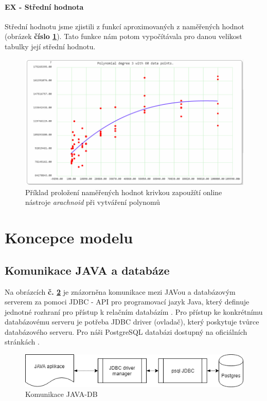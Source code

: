 \documentclass[a4paper, 11pt]{article}
\begin{document}
\paragraph{EX - Střední hodnota} Střední hodnotu jsme zjistili z funkcí  aproximovaných z naměřených hodnot (obrázek \textbf{číslo \ref{sec:obr9}}). Tato funkce nám potom vypočítávala pro danou velikost tabulky její střední hodnotu.

\begin{figure}[H]
\centering
\includegraphics[width=150mm, frame]{images/VYPOCET-KRIVEK.png}
\caption{Příklad proložení naměřených hodnot krivkou zapoužítí online nástroje \textit{arachnoid} \cite{polysolv} při vytváření polynomů}
\label{sec:obr9}
\end{figure}

\section{Koncepce modelu}


\subsection{Komunikace JAVA a databáze}
Na obrázcích \textbf{č. \ref{sec:obr8}} je znázorněna komunikace mezi JAVou a databázovým serverem za pomoci JDBC - API pro programovací jazyk Java, který definuje jednotné rozhraní pro přístup k relačním databázím \cite{connectivity}. Pro přístup ke konkrétnímu databázovému serveru je potřeba JDBC driver (ovladač), který poskytuje tvůrce databázového serveru. Pro náši PostgreSQL databázi dostupný na oficiálních stránkách \cite{jdbc}.

\begin{figure}[H]
\centering
\includegraphics[width=150mm]{images/JAVA-DB-komunikace.png}
\caption{Komunikace JAVA-DB}
\label{sec:obr8}
\end{figure}
\end{document}
